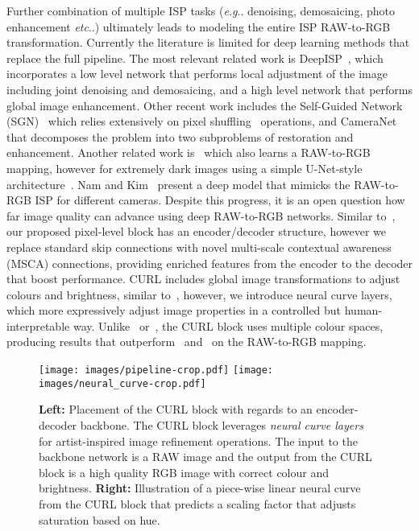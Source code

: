 \documentclass[a4paper,conference]{IEEEtran}
\makeatletter
\DeclareRobustCommand\onedot{\futurelet\@let@token\@onedot} \def\@onedot{\ifx\@let@token.\else.\null\fi\xspace}
\def\eg{\emph{e.g}\onedot} \def\Eg{\emph{E.g}\onedot}
\def\etc{\emph{etc}\onedot} \def\vs{\emph{vs}\onedot}
\makeatother
\begin{document}
Further combination of multiple ISP tasks (\eg denoising, demosaicing, photo enhancement \etc) ultimately leads to modeling the entire ISP RAW-to-RGB transformation. Currently the literature is limited for deep learning methods that 
replace the full pipeline. The most relevant related work is 
DeepISP~\cite{schwartz19}, which incorporates a low level network that performs local adjustment of the image including joint denoising and demosaicing, and a high level network that performs global image enhancement. Other recent work includes the Self-Guided Network (SGN)~\cite{Gu_2019_ICCV} which relies extensively on pixel shuffling~\cite{Ledig17} operations, and CameraNet~\cite{cameraNet_2019} that decomposes the problem into two subproblems of restoration and enhancement. Another related work is~\cite{Chen2018} which also learns a RAW-to-RGB mapping, however for extremely dark images using a simple U-Net-style architecture~\cite{Ronneberger15}. Nam and Kim~\cite{Nam2017ModellingTS} present a deep model that mimicks the RAW-to-RGB ISP for different cameras. Despite this progress, it is an open question how far image quality can advance using deep RAW-to-RGB networks. Similar to~\cite{Chen2018}, our proposed pixel-level block has an encoder/decoder structure, however we replace standard skip connections with novel multi-scale contextual awareness (MSCA) connections, providing enriched features from the encoder to the decoder that boost performance. CURL includes global image transformations to adjust colours and brightness, 
similar to~\cite{schwartz19}, however, we introduce neural curve layers, which more expressively adjust image properties in a controlled but human-interpretable way.  Unlike~\cite{Chen2018} or~\cite{schwartz19}, the CURL block 
uses multiple colour spaces, producing results that outperform~\cite{schwartz19} and~\cite{Chen2018}
on the RAW-to-RGB mapping.



\begin{figure*}[t!]
  \centering
  \texttt{[image: images/pipeline-crop.pdf]}
  \texttt{[image: images/neural\_curve-crop.pdf]}
  \caption{\textbf{Left:} Placement of the CURL block with regards to an encoder-decoder backbone. The CURL block leverages \emph{neural curve layers} for artist-inspired image refinement operations. The input to the backbone network is a RAW image and the output from the CURL block is a high quality RGB image with correct colour and brightness. \textbf{Right:} Illustration of a piece-wise linear neural curve from the CURL block that predicts a scaling factor that adjusts saturation based on hue.}
  \label{fig:DIFAR_pipeline}
\end{figure*}
\end{document}

